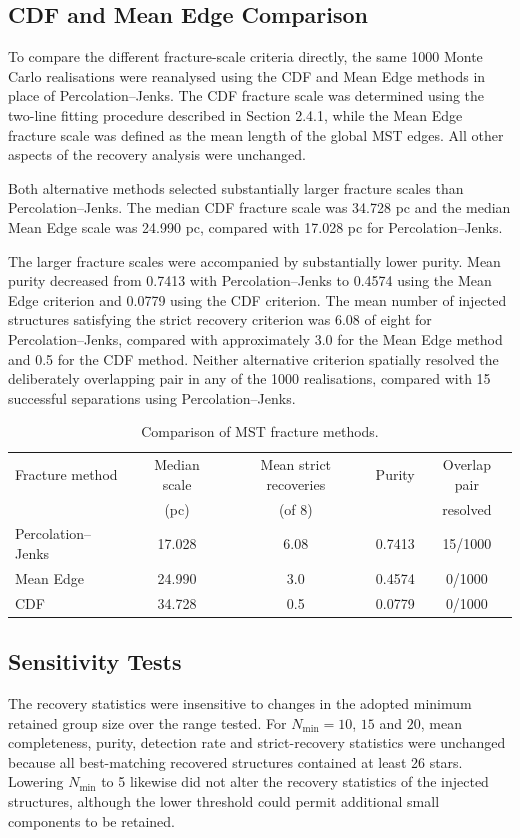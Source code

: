 \documentclass[fleqn,usenatbib]{mnras}
\begin{document}
\subsection{CDF and Mean Edge Comparison }
To compare the different fracture-scale criteria directly, the same 1000 Monte Carlo realisations were reanalysed using the CDF and Mean Edge methods in place of Percolation–Jenks. The CDF fracture scale was determined using the two-line fitting procedure described in Section 2.4.1, while the Mean Edge fracture scale was defined as the mean length of the global MST edges. All other aspects of the recovery analysis were unchanged.

Both alternative methods selected substantially larger fracture scales than Percolation–Jenks. The median CDF fracture scale was 34.728 pc and the median Mean Edge scale was 24.990 pc, compared with 17.028 pc for Percolation–Jenks. 

The larger fracture scales were accompanied by substantially lower purity. Mean purity decreased from 0.7413 with Percolation–Jenks to 0.4574 using the Mean Edge criterion and 0.0779 using the CDF criterion. The mean number of injected structures satisfying the strict recovery criterion was 6.08 of eight for Percolation–Jenks, compared with approximately 3.0 for the Mean Edge method and 0.5 for the CDF method. Neither alternative criterion spatially resolved the deliberately overlapping pair in any of the 1000 realisations, compared with 15 successful separations using Percolation–Jenks.

\begin{table}
	\centering
	\caption{Comparison of MST fracture methods.}
	\label{tab:fracture_methods}
	\begin{tabular*}{\textwidth}{@{\extracolsep{\fill}}lcccc}
		\hline
		Fracture method & Median scale & Mean strict recoveries & Purity & Overlap pair \\
		 & (pc) & (of 8) & & resolved \\
		\hline
		Percolation--Jenks & 17.028 & 6.08 & 0.7413 & 15/1000 \\
		Mean Edge          & 24.990 & 3.0  & 0.4574 & 0/1000  \\
		CDF                & 34.728 & 0.5  & 0.0779 & 0/1000  \\
		\hline
	\end{tabular*}
\end{table}

\subsection{Sensitivity Tests}
The recovery statistics were insensitive to changes in the adopted minimum retained group size over the range tested. For $N_{\mathrm{min}} = 10$, $15$ and $20$, mean completeness, purity, detection rate and strict-recovery statistics were unchanged because all best-matching recovered structures contained at least 26 stars. Lowering $N_{\mathrm{min}}$ to 5 likewise did not alter the recovery statistics of the injected structures, although the lower threshold could permit additional small components to be retained.
\end{document}
